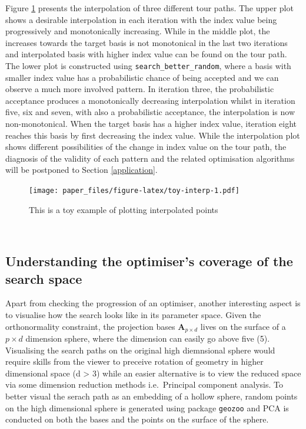 \documentclass[12pt]{article}
\begin{document}
Figure \ref{toy-interp} presents the interpolation of three different tour paths. The upper plot shows a desirable interpolation in each iteration with the index value being progressively and monotonically increasing. While in the middle plot, the increases towards the target basis is not monotonical in the last two iterations and interpolated basis with higher index value can be found on the tour path. The lower plot is constructed using \texttt{search\_better\_random}, where a basis with smaller index value has a probabilistic chance of being accepted and we can observe a much more involved pattern. In iteration three, the probabilistic acceptance produces a monotonically decreasing interpolation whilst in iteration five, six and seven, with also a probabilistic acceptance, the interpolation is now non-monotonical. When the target basis has a higher index value, iteration eight reaches this basis by first decreasing the index value. While the interpolation plot shows different possibilities of the change in index value on the tour path, the diagnosis of the validity of each pattern and the related optimisation algorithms will be postponed to Section \ref{application}.

\begin{figure}
\centering
\texttt{[image: paper\_files/figure-latex/toy-interp-1.pdf]}
\caption{\label{fig:toy-interp}\label{toy-interp} This is a toy example of plotting interpolated points}
\end{figure}

~

\hypertarget{understanding-the-optimisers-coverage-of-the-search-space}{%
\subsection{Understanding the optimiser's coverage of the search space}\label{understanding-the-optimisers-coverage-of-the-search-space}}

Apart from checking the progression of an optimiser, another interesting aspect is to visualise how the search looks like in its parameter space. Given the orthonormality constraint, the projection bases \(\mathbf{A}_{p \times d}\) lives on the surface of a \(p \times d\) dimension sphere, where the dimension can easily go above five (5). Visualising the search paths on the original high diemnsional sphere would require skills from the viewer to preceive rotation of geometry in higher dimensional space (d \textgreater{} 3) while an easier alternative is to view the reduced space via some dimension reduction methods i.e.~Principal component analysis. To better visual the serach path as an embedding of a hollow sphere, random points on the high dimensional sphere is generated using package \texttt{geozoo} and PCA is conducted on both the bases and the points on the surface of the sphere.
\end{document}
